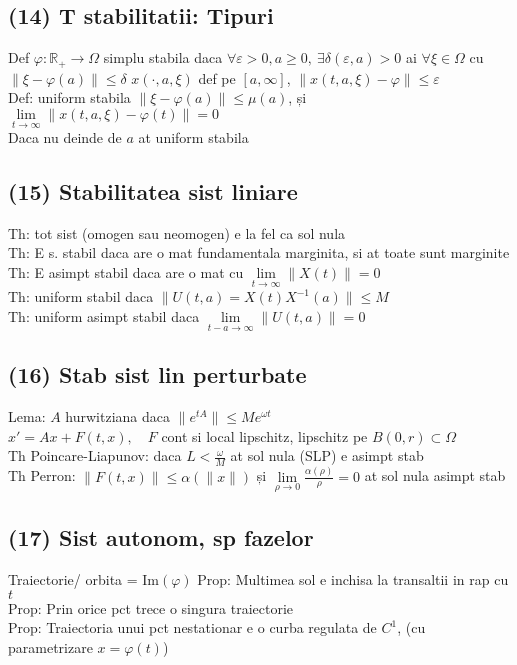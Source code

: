 \documentclass{article}
\newcommand*{\R}{\mathbb{R}}
\begin{document}
\subsection*{(14) T stabilitatii: Tipuri}
Def $\varphi :\R_+ \to \Omega $ simplu stabila daca $\forall \varepsilon > 0, a \geq 0,\ \exists \delta(\varepsilon, a) > 0 $ ai $\forall \xi \in \Omega$
cu $\|\xi - \varphi(a) \| \leq \delta$
$x(\cdot, a, \xi)$ def pe $[a, \infty]$, $\|x(t,a,\xi) -\varphi \| \leq \varepsilon $\\
Def: uniform stabila $\| \xi - \varphi(a) \| \leq \mu(a)$, și $\lim\limits_{t\to \infty} \| x(t, a, \xi) - \varphi(t) \| = 0$\\
Daca nu deinde de $a $ at uniform stabila
\subsection*{(15) Stabilitatea sist liniare}
Th: tot sist (omogen sau neomogen) e la fel ca sol nula\\
Th: E s. stabil daca are o mat fundamentala marginita, si at toate sunt marginite\\
Th: E asimpt stabil daca are o mat cu $\lim\limits_{t\to \infty} \|X(t)\|=0$\\
Th: uniform stabil daca $\|U(t,a) = X(t)X^{-1}(a)\| \leq M$\\
Th: uniform asimpt stabil daca $\lim\limits_{t-a\to \infty} \|U(t,a) \| = 0$
\subsection*{(16) Stab sist lin perturbate}
Lema: $A$ hurwitziana daca $\|e^{tA}\| \leq M e ^{\omega t}$\\
$x' = Ax + F(t,x), \quad F$ cont si local lipschitz, lipschitz pe $B(0, r) \subset \Omega$\\
Th Poincare-Liapunov: daca $L < \displaystyle \frac{\omega}{M}$ at sol nula (SLP) e asimpt stab\\
Th Perron: $\| F(t, x) \| \leq \alpha(\|x\|) $ și $\lim\limits_{\rho\to 0}\frac{\alpha(\rho)}{\rho} = 0$ at sol nula asimpt stab
\subsection*{(17) Sist autonom, sp fazelor}
Traiectorie/ orbita = Im$(\varphi)$
Prop: Multimea sol e inchisa la transaltii in rap cu $t$\\
Prop: Prin orice pct trece o singura traiectorie\\
Prop: Traiectoria unui pct nestationar e o curba regulata de $C^1$, (cu parametrizare $x = \varphi(t)$)
\end{document}
